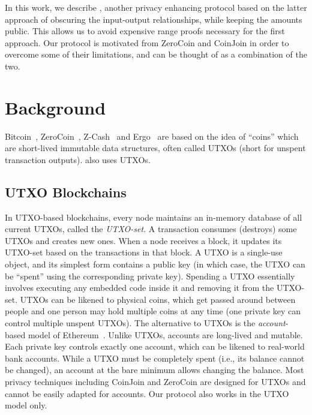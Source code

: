 \documentclass[runningheads]{llncs}
\begin{document}
In this work, we describe \algname, another privacy enhancing protocol based on the latter approach of obscuring the input-output relationships, while keeping the amounts public. This allows us to avoid expensive range proofs necessary for the first approach. Our protocol is motivated from ZeroCoin and CoinJoin in order to overcome some of their limitations, and can be thought of as a combination of the two.


\section{Background}

Bitcoin~\cite{Nak08}, ZeroCoin~\cite{zerocoin}, Z-Cash~\cite{zcash} and Ergo~\cite{ergo} are based on the idea of ``coins'' which are short-lived immutable data structures, often called UTXOs (short for {unspent transaction outputs}). \algname also uses UTXOs. 

\subsection{UTXO Blockchains}
In UTXO-based blockchains, every node maintains an in-memory database of all current UTXOs, called the {\em UTXO-set}. A transaction consumes (destroys) some UTXOs and creates new ones. When a node receives a block, it updates its UTXO-set based on the transactions in that block. A UTXO is a single-use object, and its simplest form contains a public key (in which case, the UTXO can be ``spent'' using the corresponding private key). Spending a UTXO essentially involves executing any embedded code inside it and removing it from the UTXO-set. UTXOs can be likened to physical coins, which get passed around between people and one person may hold multiple coins at any time (one private key can control multiple unspent UTXOs). 
The alternative to UTXOs is the {\em account}-based model of Ethereum~\cite{wood2014ethereum}. Unlike UTXOs, accounts are long-lived and mutable. Each private key controls exactly one account, which can be likened to real-world bank accounts. While a UTXO must be completely spent (i.e., its balance cannot be changed), an account at the bare minimum allows changing the balance. Most privacy techniques including CoinJoin and ZeroCoin are designed for UTXOs and cannot be easily adapted for accounts. Our protocol also works in the UTXO model only. %
\end{document}

